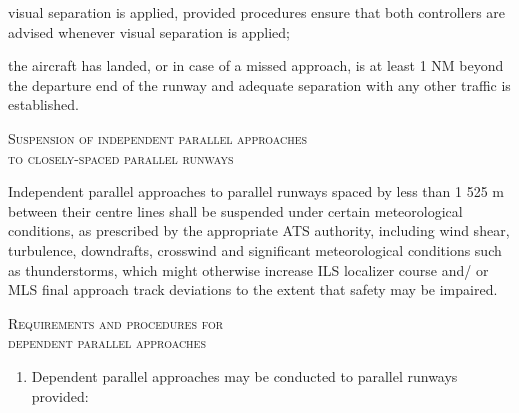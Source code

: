 \documentclass[../vATM.tex]{subfiles}
\begin{document}
\begin{enumeratesc}
\begin{enumerate}
            \begin{enumalph}
                \item visual separation is applied, provided procedures ensure that both controllers are advised whenever visual separation is applied;
                \item the aircraft has landed, or in case of a missed approach, is at least 1 NM beyond the departure end of the runway and adequate separation with any other traffic is established.
            \end{enumalph}

        \end{enumerate}

        \item \textsc{Suspension of independent parallel approaches \\ to closely-spaced parallel runways}
        \begin{enumempty}
            \item Independent parallel approaches to parallel runways spaced by less than 1 525 m between their centre lines shall be suspended under certain meteorological conditions, as prescribed by the appropriate ATS authority, including wind shear, turbulence, downdrafts, crosswind and significant meteorological conditions such as thunderstorms, which might otherwise increase ILS localizer course and/ or MLS final approach track deviations to the extent that safety may be impaired.
        \end{enumempty}

        \item \textsc{Requirements and procedures for \\ dependent parallel approaches}
        \begin{enumerate}
            \item Dependent parallel approaches may be conducted to parallel runways provided:


\end{enumerate}
\end{enumeratesc}
\end{document}
